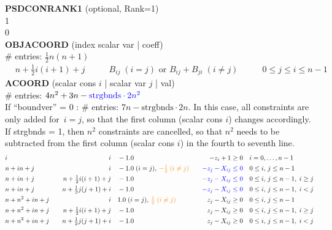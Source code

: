 \documentclass[11pt,a4paper]{article}
\theoremstyle{definition}
\begin{document}
{{\color{green}\textbf{PSDCONRANK1} (optional, Rank=1) \\
1 \\
0\\}
\textbf{OBJACOORD} (index scalar var | coeff) \\
\# entries: $\tfrac{1}{2}n(n+1)$\\
\[
  \begin{aligned}
    &n+\tfrac{1}{2}i(i+1)+j \qquad & B_{ij} \; (i=j) \text{ or } B_{ij} +
    B_{ji} \; (i\neq j) \qquad & 0 \leq j \leq i \leq n-1
  \end{aligned}
\]
\textbf{ACOORD} (scalar cons $i$ | scalar var $j$ | val) \\
\# entries: $4n^2+3n - {\color{blue} \text{strgbnds}\cdot 2n^2}$ \\
{\color{violet} If ``boundver'' = 0 : \# entries: $7n -
  \text{strgbnds}\cdot 2n$. In this case, all constraints are only added
  for~$i=j$, so that the first column (scalar cons $i$) changes accordingly.} \\
{\color{blue} If strgbnds = 1, then $n^2$ constraints are cancelled, so
  that $n^2$ needs to be subtracted from the first column
  (scalar cons $i$) in the fourth to seventh line.}
\[
  \begin{aligned}
    & i \quad & i \quad & -1.0 \quad & -z_i + 1 \geq 0 \quad & i =
    0,\dots,n-1 \\
    & n+in+j \quad & i \quad & -1.0\; (i = j),\,
    {\color{orange} -\tfrac{1}{2}\; (i\neq j)} \quad & {\color{blue}-z_j -
      X_{ij} \leq 0}
    \quad & 0 \leq i,\, j \leq n-1\\
    & n+in+j \quad & n+\tfrac{1}{2}i(i+1)+j \quad & -1.0
    \quad & {\color{blue}-z_j - X_{ij} \leq 0} \quad & 0 \leq i,\, j \leq
    n-1, \; i \geq j \\
    & n+in+j \quad & n+\tfrac{1}{2}j(j+1)+i \quad & -1.0
    \quad & {\color{blue}-z_j - X_{ij} \leq 0} \quad & 0 \leq i,\, j \leq
    n-1, \; i < j \\
    & n+n^2+in+j \quad & i \quad & 1.0\; (i
    = j),\, {\color{orange} \tfrac{1}{2}\; (i\neq j)} \quad & z_j - X_{ij} \geq 0
    \quad & 0
    \leq i,\, j \leq n-1 \\
    & n+n^2+in+j \quad &
    n+\tfrac{1}{2}i(i+1)+j \quad & -1.0 \quad & z_j - X_{ij} \geq 0 \quad &
    0 \leq i,\, j \leq n-1,\; i \geq j \\
    & n+n^2+in+j \quad &
    n+\tfrac{1}{2}j(j+1)+i \quad & -1.0 \quad & z_j - X_{ij} \geq 0 \quad &
    0 \leq i,\, j \leq n-1,\; i < j \\

\end{aligned}\]}
\end{document}
